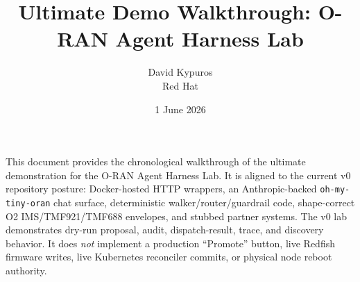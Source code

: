 \documentclass[10pt,a4paper]{article}
\title{\textbf{Ultimate Demo Walkthrough: O-RAN Agent Harness Lab}}
\author{David Kypuros \\ \small Red Hat}
\date{1 June 2026}
\begin{document}
\maketitle

This document provides the chronological walkthrough of the ultimate demonstration for the O-RAN Agent Harness Lab. It is aligned to the current v0 repository posture: Docker-hosted HTTP wrappers, an Anthropic-backed \texttt{oh-my-tiny-oran} chat surface, deterministic walker/router/guardrail code, shape-correct O2 IMS/TMF921/TMF688 envelopes, and stubbed partner systems. The v0 lab demonstrates dry-run proposal, audit, dispatch-result, trace, and discovery behavior. It does \emph{not} implement a production ``Promote'' button, live Redfish firmware writes, live Kubernetes reconciler commits, or physical node reboot authority.
\end{document}
